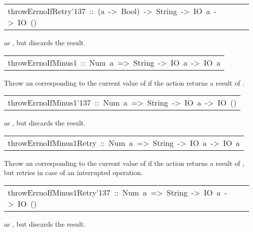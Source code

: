 \begin{haddockdesc}
\item[\begin{tabular}{@{}l}
throwErrnoIfRetry{\char '137}\ ::\ (a\ ->\ Bool)\ ->\ String\ ->\ IO\ a\ ->\ IO\ ()
\end{tabular}]\haddockbegindoc
as , but discards the result.
\par

\end{haddockdesc}
\begin{haddockdesc}
\item[\begin{tabular}{@{}l}
throwErrnoIfMinus1\ ::\ Num\ a\ =>\ String\ ->\ IO\ a\ ->\ IO\ a
\end{tabular}]\haddockbegindoc
Throw an  corresponding to the current value of 
 if the  action returns a result of .
\par

\end{haddockdesc}
\begin{haddockdesc}
\item[\begin{tabular}{@{}l}
throwErrnoIfMinus1{\char '137}\ ::\ Num\ a\ =>\ String\ ->\ IO\ a\ ->\ IO\ ()
\end{tabular}]\haddockbegindoc
as , but discards the result.
\par

\end{haddockdesc}
\begin{haddockdesc}
\item[\begin{tabular}{@{}l}
throwErrnoIfMinus1Retry\ ::\ Num\ a\ =>\ String\ ->\ IO\ a\ ->\ IO\ a
\end{tabular}]\haddockbegindoc
Throw an  corresponding to the current value of 
 if the  action returns a result of , but retries in case of
 an interrupted operation.
\par

\end{haddockdesc}
\begin{haddockdesc}
\item[\begin{tabular}{@{}l}
throwErrnoIfMinus1Retry{\char '137}\ ::\ Num\ a\ =>\ String\ ->\ IO\ a\ ->\ IO\ ()
\end{tabular}]\haddockbegindoc
as , but discards the result.
\par

\end{haddockdesc}
